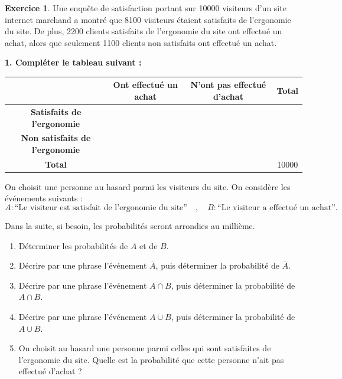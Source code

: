 \documentclass{exam}
\theoremstyle{definition}
\newtheorem{exercice}{Exercice}
\begin{document}
\large


\setlength\parindent{0pt}

\vspace{2mm}
\noindent
{}
\large

\begin{exercice}

Une enquête de satisfaction portant sur 10000 visiteurs d'un site internet marchand a montré que 8100 visiteurs étaient satisfaits de l'ergonomie du site. De plus, 2200 clients satisfaits de l'ergonomie du site ont effectué un achat, alors que seulement 1100 clients non satisfaits ont effectué un achat.

\bigskip

\textbf{1. Compléter le tableau suivant :}

\begin{center}
  \renewcommand{\arraystretch}{1.5}
\begin{tabular}{|c|c|c|c|}
\hline
 & \textbf{Ont effectué un achat} & \textbf{N'ont pas effectué d'achat} & \textbf{Total} \\
\hline
\textbf{Satisfaits de l'ergonomie} & & & \\
\hline
\textbf{Non satisfaits de l'ergonomie} & & & \\
\hline
\textbf{Total} & & & 10000 \\
\hline
\end{tabular}
\end{center}

\medskip

On choisit une personne au hasard parmi les visiteurs du site. On considère les événements suivants :
\[
A : \text{``Le visiteur est satisfait de l'ergonomie du site''}
\quad,\quad
B : \text{``Le visiteur a effectué un achat''}.
\]

Dans la suite, si besoin, les probabilités seront arrondies au millième.

\begin{enumerate}
  \item[2.] Déterminer les probabilités de $A$ et de $B$.
  \item[3.] Décrire par une phrase l'événement $\overline{A}$, puis déterminer la probabilité de $\overline{A}$.
  \item[4.] Décrire par une phrase l'événement $A \cap B$, puis déterminer la probabilité de $A \cap B$.
  \item[5.] Décrire par une phrase l'événement $A \cup B$, puis déterminer la probabilité de $A \cup B$.
  \item[6.] On choisit au hasard une personne parmi celles qui sont satisfaites de l'ergonomie du site. Quelle est la probabilité que cette personne n'ait pas effectué d'achat ?
\end{enumerate}


\end{exercice}
\end{document}
